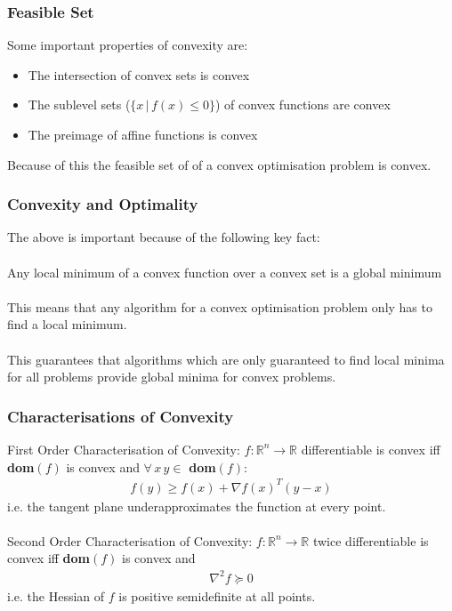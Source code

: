 \documentclass{beamer}
\def\rnum{\mathbb{R}}
\begin{document}
\begin{frame}
    \frametitle{Feasible Set}
    Some important properties of convexity are:
    \begin{itemize}
        \item The intersection of convex sets is convex
        \item The sublevel sets ($\{x \, | \, f(x) \leq 0 \}$) of convex
            functions are convex
        \item The preimage of affine functions is convex
    \end{itemize}
    Because of this the feasible set of of a convex optimisation problem is
    convex.
\end{frame}

\begin{frame}
    \frametitle{Convexity and Optimality}
    The above is important because of the following key fact:
    \\~\\
    Any local minimum of a convex function over a convex set is a global
    minimum
    \\~\\
    This means that any algorithm for a convex optimisation problem only has to
    find a local minimum.
    \\~\\
    This guarantees that algorithms which are only
    guaranteed to find local minima for all problems provide global minima for
    convex problems.
\end{frame}

\begin{frame}
    \frametitle{Characterisations of Convexity}
    First Order Characterisation of Convexity: $f : \rnum^{n} \rightarrow \rnum$
    differentiable is convex iff \textbf{dom}$(f)$ is convex and $\forall \, x
    \, y \in$ \textbf{dom}$(f)$:
    \begin{align*}
        f(y) \geq f(x) + \nabla f(x)^{T}(y-x)
    \end{align*}
    i.e. the tangent plane underapproximates the function at every point.
    \\~\\
    Second Order Characterisation of Convexity: $f : \rnum^{n} \rightarrow
    \rnum$ twice differentiable is convex iff \textbf{dom}$(f)$ is convex and
    \begin{align*}
        \nabla^{2}f \succeq 0
    \end{align*}
    i.e. the Hessian of $f$ is positive semidefinite at all points.
\end{frame}
\end{document}
